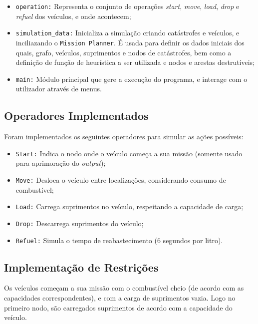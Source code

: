 \documentclass[a4paper,12pt]{scrreprt}
\begin{document}
\begin{itemize}
    \item \texttt{operation:} Representa o conjunto de operações \textit{start}, \textit{move}, \textit{load},
    \textit{drop} e \textit{refuel} dos veículos, e onde acontecem;

    \item \texttt{simulation\_data:} Inicializa a simulação criando catástrofes e veículos,
    e inciliazando o \texttt{Mission Planner}. É usada para definir os dados iniciais dos quais, grafo, veículos,
    suprimentos e nodos de catástrofes, bem como a definição de função de heurística a ser utilizada e
    nodos e arestas destrutíveis;

    \item \texttt{main:} Módulo principal que gere a execução do programa, e interage com o utilizador
    através de menus.
\end{itemize}


\subsection{Operadores Implementados}

Foram implementados os seguintes operadores para simular as ações possíveis:

\begin{itemize}
    \item \texttt{Start:} Indica o nodo onde o veículo começa a sua missão (somente usado para 
    aprimoração do \textit{output});
    \item \texttt{Move:} Desloca o veículo entre localizações, considerando consumo 
    de combustível;
    \item \texttt{Load:} Carrega suprimentos no veículo, respeitando a capacidade de carga;
    \item \texttt{Drop:} Descarrega suprimentos do veículo;
    \item \texttt{Refuel:} Simula o tempo de reabastecimento (6 segundos por litro).
\end{itemize}

\clearpage

\subsection{Implementação de Restrições}

Os veículos começam a sua missão com o combustível cheio (de acordo com as capacidades correspondentes), e com a carga de suprimentos
vazia. Logo no primeiro nodo, são carregados suprimentos de acordo com a capacidade do veículo.
\end{document}
